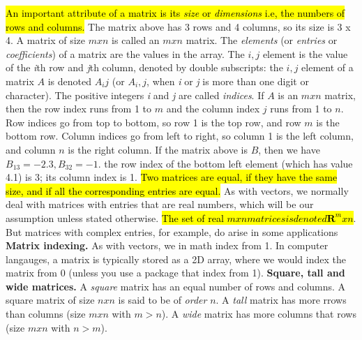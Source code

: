 \documentclass[11pt,oneside,a4paper,openright]{article}
\begin{document}
\hl{An important attribute of a matrix is its \emph{size} or \emph{dimensions} i.e, the numbers
of rows and columns.} The matrix above has 3 rows and 4 columns, so its size is 3 x 4.\newline
A matrix of size $m x n$ is called an $m x n$ matrix.\newline
The \emph{elements} (or \emph{entries} or \emph{coefficients}) of a matrix are the values in the array.\newline
The $i,j$ element is the value of the \emph{i}th row and \emph{j}th column, denoted by double subscripts:
the $i,j$ element of a matrix $A$ is denoted $A_ij$ (or $A_i,j$, when \emph{i} or \emph{j} is more than one digit or character).\newline
The positive integers \emph{i} and \emph{j} are called \emph{indices}. \newline
If $A$ is an $m x n$ matrix, then the row index runs from 1 to $m$ and the column index $j$ runs from 1 to $n$.
Row indices go from top to bottom, so row 1 is the top row, and row $m$ is the bottom row. Column indices go from left to right, so column
1 is the left column, and column $n$ is the right column.\newline
If the matrix above is $B$, then we have $B_13 = -2.3, B_32 = -1.$ the row index of the bottom left element (which has value 4.1) is 3;
its column index is 1.\newline
\hl{Two matrices are equal, if they have the same size, and if all the corresponding entries are equal.}\newline
As with vectors, we normally deal with matrices with entries that are real numbers, which will be our assumption unless stated otherwise.
\hl{The set of real $m x n matrices is denoted \textbf{R}^mxn$}. But matrices with complex entries, for example, do arise in some applications
\newline\newline
\textbf{Matrix indexing.} As with vectors, we in math index from 1. In computer langauges, a matrix is typically stored as a 2D array, where we would index the matrix from 0 (unless you use a package that index from 1). 
\newline\newline
\textbf{Square, tall and wide matrices.} A \emph{square} matrix has an equal number of rows and columns. A square matrix of size $n x n$ is said to be of \emph{order} $n$.
A \emph{tall} matrix has more rrows than columns (size $m x n$ with $m > n$). A \emph{wide} matrix has more columns that rows (size $m x n$ with $n > m$).
\end{document}
